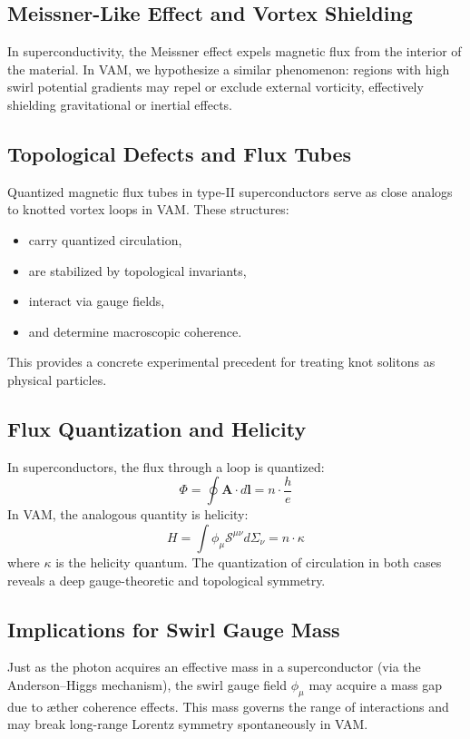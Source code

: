         \subsection{Meissner-Like Effect and Vortex Shielding}
        In superconductivity, the Meissner effect expels magnetic flux from the interior of the material. In VAM, we hypothesize a similar phenomenon: regions with high swirl potential gradients may repel or exclude external vorticity, effectively shielding gravitational or inertial effects.

        \subsection{Topological Defects and Flux Tubes}
        Quantized magnetic flux tubes in type-II superconductors serve as close analogs to knotted vortex loops in VAM. These structures:
        \begin{itemize}
            \item carry quantized circulation,
            \item are stabilized by topological invariants,
            \item interact via gauge fields,
            \item and determine macroscopic coherence.
        \end{itemize}
        This provides a concrete experimental precedent for treating knot solitons as physical particles.

        \subsection{Flux Quantization and Helicity}
        In superconductors, the flux through a loop is quantized:
        \begin{equation}
            \Phi = \oint \mathbf{A} \cdot d\mathbf{l} = n \cdot \frac{h}{e}
        \end{equation}
        In VAM, the analogous quantity is helicity:
        \begin{equation}
            H = \int \phi_\mu \mathcal{S}^{\mu\nu} d\Sigma_\nu = n \cdot \kappa
        \end{equation}
        where $\kappa$ is the helicity quantum. The quantization of circulation in both cases reveals a deep gauge-theoretic and topological symmetry.

        \subsection{Implications for Swirl Gauge Mass}
        Just as the photon acquires an effective mass in a superconductor (via the Anderson–Higgs mechanism), the swirl gauge field $\phi_\mu$ may acquire a mass gap due to æther coherence effects. This mass governs the range of interactions and may break long-range Lorentz symmetry spontaneously in VAM.

